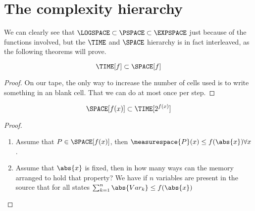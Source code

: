 \section{The complexity hierarchy}
We can clearly see that $\LOGSPACE\subset \PSPACE\subset\EXPSPACE$ just because of 
the functions involved, but the $\TIME$ and $\SPACE$ 
hierarchy is in fact interleaved, as the following theorems will prove.
\begin{theorem}
	\[\TIME[f] \subset \SPACE[f]\]
\end{theorem}
\begin{proof}
	On our tape, the only way to increase the number of cells used is to write 
	something in an blank cell. That we can do at most once per step.
\end{proof}

\begin{theorem}
	\[\SPACE[f(x)] \subset \TIME[2^{f(x)}]\]
\end{theorem}
\begin{proof}
	\begin{enumerate}
		\item Assume that $P\in\SPACE[f(x)]$, then $\measurespace{P}(x)\leq f(\abs{x})\forall x$.
		\item Assume that $\abs{x}$ is fixed, then in how many ways can the 
			memory arranged to hold that property? We have if $n$ variables are 
			present in the source that for all states 
			$\sum_{k=1}^n\abs{Var_k} \leq f(\abs{x})$

	\end{enumerate}
	\end{proof}
